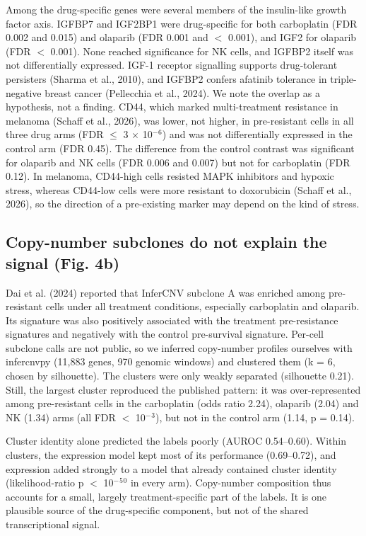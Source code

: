 \documentclass[11pt,a4paper]{article}
\begin{document}
Among the drug-specific genes were several members of the insulin-like growth factor axis. IGFBP7 and IGF2BP1 were drug-specific for both carboplatin (FDR 0.002 and 0.015) and olaparib (FDR 0.001 and $<$ 0.001), and IGF2 for olaparib (FDR $<$ 0.001). None reached significance for NK cells, and IGFBP2 itself was not differentially expressed. IGF-1 receptor signalling supports drug-tolerant persisters (Sharma et al., 2010), and IGFBP2 confers afatinib tolerance in triple-negative breast cancer (Pellecchia et al., 2024). We note the overlap as a hypothesis, not a finding. CD44, which marked multi-treatment resistance in melanoma (Schaff et al., 2026), was lower, not higher, in pre-resistant cells in all three drug arms (FDR $\leq$ 3 $\times$ 10$^-$$^6$) and was not differentially expressed in the control arm (FDR 0.45). The difference from the control contrast was significant for olaparib and NK cells (FDR 0.006 and 0.007) but not for carboplatin (FDR 0.12). In melanoma, CD44-high cells resisted MAPK inhibitors and hypoxic stress, whereas CD44-low cells were more resistant to doxorubicin (Schaff et al., 2026), so the direction of a pre-existing marker may depend on the kind of stress.

\subsection*{Copy-number subclones do not explain the signal (Fig. 4b)}

Dai et al. (2024) reported that InferCNV subclone A was enriched among pre-resistant cells under all treatment conditions, especially carboplatin and olaparib. Its signature was also positively associated with the treatment pre-resistance signatures and negatively with the control pre-survival signature. Per-cell subclone calls are not public, so we inferred copy-number profiles ourselves with infercnvpy (11,883 genes, 970 genomic windows) and clustered them (k = 6, chosen by silhouette). The clusters were only weakly separated (silhouette 0.21). Still, the largest cluster reproduced the published pattern: it was over-represented among pre-resistant cells in the carboplatin (odds ratio 2.24), olaparib (2.04) and NK (1.34) arms (all FDR $<$ 10$^-$$^3$), but not in the control arm (1.14, p = 0.14).

Cluster identity alone predicted the labels poorly (AUROC 0.54--0.60). Within clusters, the expression model kept most of its performance (0.69--0.72), and expression added strongly to a model that already contained cluster identity (likelihood-ratio p $<$ 10$^-$$^5$$^0$ in every arm). Copy-number composition thus accounts for a small, largely treatment-specific part of the labels. It is one plausible source of the drug-specific component, but not of the shared transcriptional signal.
\end{document}
